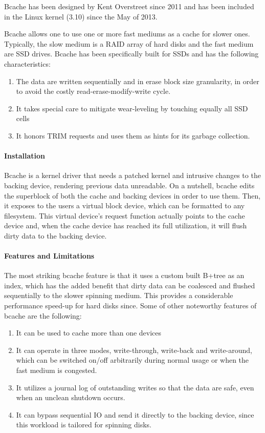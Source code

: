 Bcache has been designed by Kent Overstreet since 2011 and has been included in 
the Linux kernel (3.10) since the May of 2013.

Bcache allows one to use one or more fast mediums as a cache for slower ones.  
Typically, the slow medium is a RAID array of hard disks and the fast medium 
are SSD drives. Bcache has been specifically built for SSDs and has the 
following characteristics:

\begin{enumerate}
	\item The data are written sequentially and in erase block size 
		granularity, in order to avoid the costly read-erase-modify-write 
		cycle.
	\item It takes special care to mitigate wear-leveling by touching equally 
		all SSD cells
	\item It honors TRIM requests and uses them as hints for its garbage 
		collection.
\end{enumerate}

\paragraph{Installation}

Bcache is a kernel driver that needs a patched kernel and intrusive changes to 
the backing device, rendering previous data unreadable. On a nutshell, bcache 
edits the superblock of both the cache and backing devices in order to use 
them.  Then, it exposes to the users a virtual block device, which can be 
formatted to any filesystem.  This virtual device's request function actually 
points to the cache device and, when the cache device has reached its full 
utilization, it will flush dirty data to the backing device.

\paragraph{Features and Limitations}

The most striking bcache feature is that it uses a custom built B+tree as an 
index, which has the added benefit that dirty data can be coalesced and flushed 
sequentially to the slower spinning medium. This provides a considerable 
performance speed-up for hard disks since. Some of other noteworthy features of 
bcache are the following:

\begin{enumerate}
	\item It can be used to cache more than one devices
	\item It can operate in three modes, write-through, write-back and 
		write-around, which can be switched on/off arbitrarily during normal 
		usage or when the fast medium is congested.
	\item It utilizes a journal log of outstanding writes so that the data are 
		safe, even when an unclean shutdown occurs.
	\item It can bypass sequential IO and send it directly to the backing 
		device, since this workload is tailored for spinning disks.
\end{enumerate}

